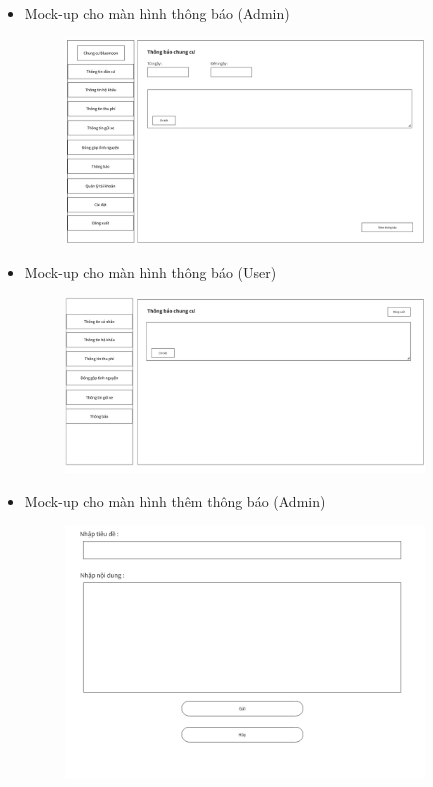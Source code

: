 \documentclass{article}
\begin{document}
\begin{itemize}
\begin{figure}[H]
    \end{figure}
    \newpage
    \item Mock-up cho màn hình thông báo (Admin)
    \begin{figure}[H]
        \centering
        \includegraphics[width=0.9\textwidth]{Ảnh chương 4/Màn hình thông báo Admin.png}
    \end{figure}
    \item Mock-up cho màn hình thông báo (User)
    \begin{figure}[H]
        \centering
        \includegraphics[width=0.9\textwidth]{Ảnh chương 4/Màn hình thông báo User.png}
    \end{figure}
    \newpage
    \item Mock-up cho màn hình thêm thông báo (Admin)
    \begin{figure}[H]
        \centering
        \includegraphics[width=0.9\textwidth]{Ảnh chương 4/Màn hình thêm thông báo.png}
    \end{figure}


\end{itemize}
\end{document}
